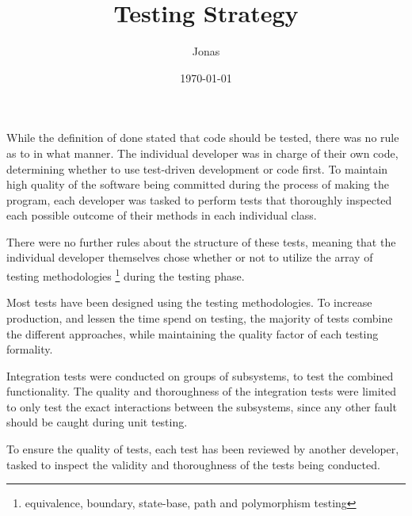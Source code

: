 \documentclass[12pt,a4paper] {report}
\author{Jonas}
\title{Testing Strategy}
\date{\today}
\begin{document}
	\long{}
	\maketitle
	
	
	While the definition of done stated that code should be tested, there was no rule as to in what manner. The individual developer was in charge of their own code, determining whether to use test-driven development or code first.
	To maintain high quality of the software being committed during the process of making the program, each developer was tasked to perform tests that thoroughly inspected each possible outcome of their methods in each individual class.
	
	There were no further rules about the structure of these tests, meaning that the individual developer themselves chose whether or not to utilize the array of testing methodologies \footnote{equivalence, boundary, state-base, path and polymorphism testing} during the testing phase.
	
	Most tests have been designed using the testing methodologies. To increase production, and lessen the time spend on testing, the majority of tests combine the different approaches, while maintaining the quality factor of each testing formality.

	Integration tests were conducted on groups of subsystems, to test the combined functionality. The quality and thoroughness of the integration tests were limited to only test the exact interactions between the subsystems, since any other fault should be caught during unit testing.
	
	To ensure the quality of tests, each test has been reviewed by another developer, tasked to inspect the validity and thoroughness of the tests being conducted.
	
	
\end{document}
